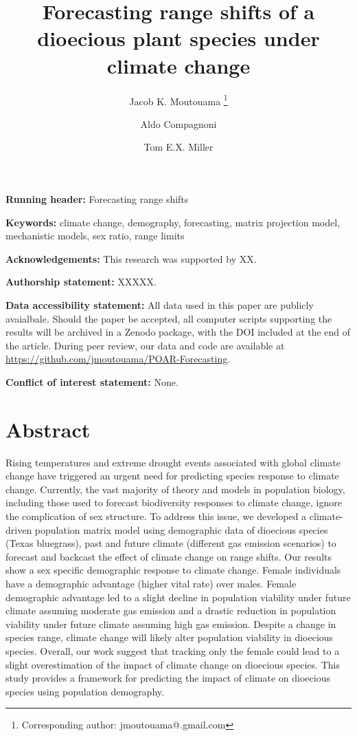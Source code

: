 \documentclass[12pt]{article}
\title{Forecasting range shifts of a dioecious plant species under climate change}
\author[1]{Jacob K. Moutouama \thanks{Corresponding author: jmoutouama@.gmail.com}}
\author[2]{Aldo Compagnoni}
\author[1]{Tom E.X. Miller}
\affil[1]{Program in Ecology and Evolutionary Biology, Department of BioSciences, Rice University, Houston, TX USA}
\affil[2]{Institute of Biology, Martin Luther University Halle-Wittenberg, Halle, Germany; and German Centre for Integrative Biodiversity Research (iDiv), Leipzig, Germany}
\date{} %
\begin{document}
\renewcommand{\baselinestretch}{1.2}
\maketitle

\bigskip 
\noindent\textbf{Running header:} Forecasting range shifts

\bigskip 
\noindent\textbf{Keywords:} climate change, demography, forecasting, matrix projection model, mechanistic models, sex ratio, range limits

\bigskip 
\noindent\textbf{Acknowledgements:} This research was supported by  XX.

\bigskip
\noindent\textbf{Authorship statement:} XXXXX.  

\bigskip 
\noindent\textbf{Data accessibility statement:} All data \citep{dryaddata} used in this paper are  publicly avaialbale. Should the paper be accepted, all computer scripts supporting the results will be archived in a Zenodo package, with the DOI included at the end of the article. During peer review, our data and code are available at \url{https://github.com/jmoutouama/POAR-Forecasting}. 

\bigskip 
\noindent\textbf{Conflict of interest statement:} None.
\newpage
\linenumbers
\section*{Abstract}
Rising temperatures and extreme drought events associated with global climate change have triggered an urgent need for predicting species response to climate change.
Currently, the vast majority of theory and models in population biology, including those used to forecast biodiversity responses to climate change, ignore the complication of sex structure. 
To address this issue, we developed a climate-driven population matrix model using
demographic data of dioecious species (Texas bluegrass), past and future climate (different gas emission scenarios) to forecast and backcast the effect of climate change on range shifts.
Our results show a sex specific demographic response to climate change.
Female individuals have a demographic advantage (higher vital rate) over males. 
Female demographic advantage led to a slight decline in population viability under  future climate assuming moderate gas emission and a drastic reduction in population viability under future climate assuming high gas emission. 
Despite a change in species range, climate change will likely alter population viability in dioecious species. 
Overall, our work suggest that tracking only the female could lead to a slight overestimation of the impact of climate change on dioecious species. 
This study provides a framework for predicting the impact of climate on dioecious species using population demography. 
\end{document}
